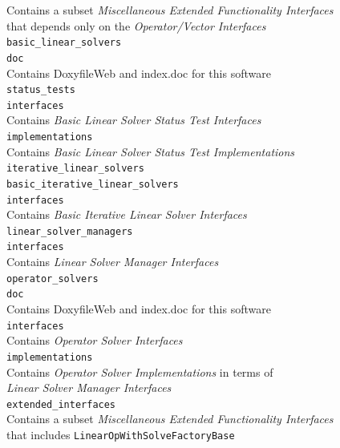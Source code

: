 \documentclass[pdf,ps2pdf,11pt]{SANDreport}
\begin{document}
\>\>\>\>\>\>Contains a subset {}\textit{Miscellaneous Extended Functionality Interfaces} \\
\>\>\>\>\>\>\>that depends only on the {}\textit{Operator/Vector Interfaces} \\
\>\>\>\>\texttt{basic\_linear\_solvers} \\
\>\>\>\>\>\texttt{doc}\\
\>\>\>\>\>\>Contains DoxyfileWeb and index.doc for this software \\
\>\>\>\>\>\texttt{status\_tests} \\
\>\>\>\>\>\>\texttt{interfaces} \\
\>\>\>\>\>\>\>Contains {}\textit{Basic Linear Solver Status Test Interfaces} \\
\>\>\>\>\>\>\texttt{implementations} \\
\>\>\>\>\>\>\>Contains {}\textit{Basic Linear Solver Status Test Implementations} \\
\>\>\>\>\>\texttt{iterative\_linear\_solvers} \\
\>\>\>\>\>\>\texttt{basic\_iterative\_linear\_solvers} \\
\>\>\>\>\>\>\>\texttt{interfaces} \\
\>\>\>\>\>\>\>\>Contains {}\textit{Basic Iterative Linear Solver Interfaces} \\
\>\>\>\>\>\>\texttt{linear\_solver\_managers} \\
\>\>\>\>\>\>\>\texttt{interfaces} \\
\>\>\>\>\>\>\>\>Contains {}\textit{Linear Solver Manager Interfaces} \\
\>\>\>\>\texttt{operator\_solvers} \\
\>\>\>\>\>\texttt{doc}\\
\>\>\>\>\>\>Contains DoxyfileWeb and index.doc for this software \\
\>\>\>\>\>\texttt{interfaces} \\
\>\>\>\>\>\>Contains {}\textit{Operator Solver Interfaces} \\
\>\>\>\>\>\texttt{implementations} \\
\>\>\>\>\>\>Contains {}\textit{Operator Solver Implementations} in terms of \\
\>\>\>\>\>\>\>{}\textit{Linear Solver Manager Interfaces} \\
\>\>\>\>\>\texttt{extended\_interfaces} \\
\>\>\>\>\>\>Contains a subset {}\textit{Miscellaneous Extended Functionality Interfaces} \\
\>\>\>\>\>\>\>that includes {}\texttt{LinearOpWithSolveFactoryBase} \\
\end{document}
